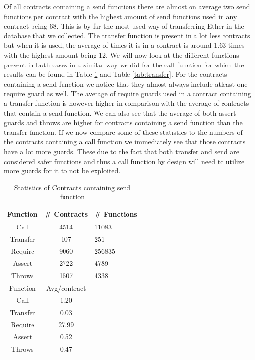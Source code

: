 \documentclass[10pt,conference]{IEEEtran}
\begin{document}
Of all contracts containing a send functions there are almost on average two send functions per contract with the highest amount of send functions used in any contract being 68. This is by far the most used way of transferring Ether in the database that we collected. The transfer function is present in a lot less contracts but when it is used, the average of times it is in a contract is around 1.63 times with the highest amount being 12. 
We will now look at the different functions present in both cases in a similar way we did for the call function for which the results can be found in Table \ref{tab:send} and Table \ref{tab:transfer}. For the contracts containing a send function we notice that they almost always include atleast one require guard as well. The average of require guards used in a contract containing a transfer function is however higher in comparison with the average of contracts that contain a send function. We can also see that the average of both assert guards and throws are higher for contracts containing a send function than the transfer function. If we now compare some of these statistics to the numbers of the contracts containing a call function we immediately see that those contracts have a lot more guards. These due to the fact that both transfer and send are considered safer functions and thus a call function by design will need to utilize more guards for it to not be exploited.

\begin{table}
  \caption{Statistics of Contracts containing send function}
  \label{tab:send}
  \begin{tabular}{ccl}
    \hline
    Function & \# Contracts & \# Functions\\
    \hline
    Call&4514&11083\\
    Transfer&107&251\\
    Require&9060&256835\\
    Assert&2722&4789\\
    Throws&1507&4338\\
    \hline
    Function & Avg/contract\\
    \hline
    Call&1.20\\
    Transfer&0.03\\
    Require&27.99\\
    Assert&0.52\\
    Throws&0.47\\
  \hline
\end{tabular}
\end{table}
\end{document}
